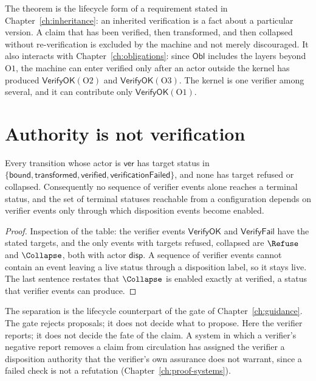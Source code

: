 The theorem is the lifecycle form of a requirement stated in Chapter~\ref{ch:inheritance}: an inherited verification is a fact about a particular version. A claim that has been verified, then transformed, and then collapsed without re-verification is excluded by the machine and not merely discouraged. It also interacts with Chapter~\ref{ch:obligations}: since $\mathsf{Obl}$ includes the layers beyond $\mathrm O1$, the machine can enter \textsf{verified} only after an actor outside the kernel has produced $\mathsf{VerifyOK}(\mathrm O2)$ and $\mathsf{VerifyOK}(\mathrm O3)$. The kernel is one verifier among several, and it can contribute only $\mathsf{VerifyOK}(\mathrm O1)$.

\section{Authority is not verification}

\begin{theorem}
\label{thm:authority}
Every transition whose actor is $\mathsf{ver}$ has target status in $\{\textsf{bound},\textsf{transformed},\textsf{verified},\textsf{verificationFailed}\}$, and none has target \textsf{refused} or \textsf{collapsed}. Consequently no sequence of verifier events alone reaches a terminal status, and the set of terminal statuses reachable from a configuration depends on verifier events only through which disposition events become enabled.
\end{theorem}

\begin{proof}
Inspection of the table: the verifier events $\mathsf{VerifyOK}$ and $\mathsf{VerifyFail}$ have the stated targets, and the only events with targets \textsf{refused}, \textsf{collapsed} are $\Refuse$ and $\Collapse$, both with actor $\mathsf{disp}$. A sequence of verifier events cannot contain an event leaving a live status through a disposition label, so it stays live. The last sentence restates that $\Collapse$ is enabled exactly at \textsf{verified}, a status that verifier events can produce.
\end{proof}

The separation is the lifecycle counterpart of the gate of Chapter~\ref{ch:guidance}. The gate rejects proposals; it does not decide what to propose. Here the verifier reports; it does not decide the fate of the claim. A system in which a verifier's negative report removes a claim from circulation has assigned the verifier a disposition authority that the verifier's own assurance does not warrant, since a failed check is not a refutation (Chapter~\ref{ch:proof-systems}).

